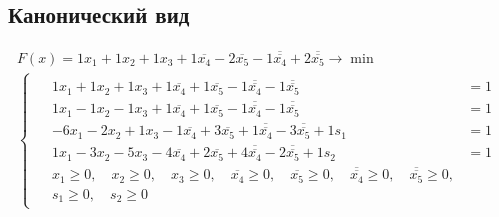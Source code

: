 \subsection*{Канонический вид}
\begin{equation}
\begin{matrix}
    F(x) = 1x_{1} + 1x_{2} + 1x_{3} + 1\overline{x_{4}} -2\overline{x_{5}} -1\overline{\overline{x_{4}}} + 2\overline{\overline{x_{5}}} \to \min \\
    \begin{cases}
    \begin{aligned}
        & 1x_{1} + 1x_{2} + 1x_{3} + 1\overline{x_{4}} + 1\overline{x_{5}} -1\overline{\overline{x_{4}}} -1\overline{\overline{x_{5}}} & = 1 \\
        & 1x_{1} -1x_{2} -1x_{3} + 1\overline{x_{4}} + 1\overline{x_{5}} -1\overline{\overline{x_{4}}} -1\overline{\overline{x_{5}}} & = 1 \\
        & -6x_{1} -2x_{2} + 1x_{3} -1\overline{x_{4}} + 3\overline{x_{5}} + 1\overline{\overline{x_{4}}} -3\overline{\overline{x_{5}}} + 1s_1 & = 1 \\
        & 1x_{1} -3x_{2} -5x_{3} -4\overline{x_{4}} + 2\overline{x_{5}} + 4\overline{\overline{x_{4}}} -2\overline{\overline{x_{5}}} + 1s_2 & = 1 \\
        & x_{1} \geq 0, \quad x_{2} \geq 0, \quad x_{3} \geq 0, \quad \overline{x_{4}} \geq 0, \quad \overline{x_{5}} \geq 0, \quad \overline{\overline{x_{4}}} \geq 0, \quad \overline{\overline{x_{5}}} \geq 0, \\
        & s_1 \geq 0, \quad s_2 \geq 0
    \end{aligned}
    \end{cases}
\end{matrix}
\end{equation}

